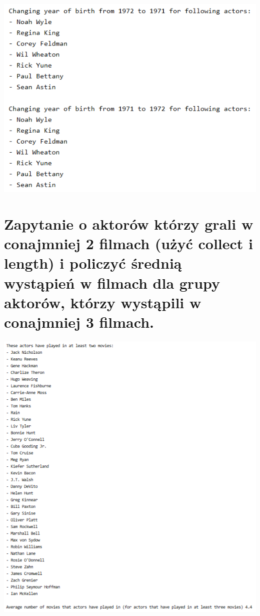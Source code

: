 \documentclass[a4paper, 11pt]{article}
\begin{document}
    

    \begin{center}
        \includegraphics{images/task6.png}
    \end{center}

    \newpage

    \section{ Zapytanie o aktorów którzy grali w conajmniej 2 filmach (użyć collect i length) i policzyć średnią
    wystąpień w filmach dla grupy aktorów, którzy wystąpili w conajmniej 3 filmach.}

    

    \begin{center}
        \includegraphics[scale=1.45]{images/task7.png}
    \end{center}
\end{document}
